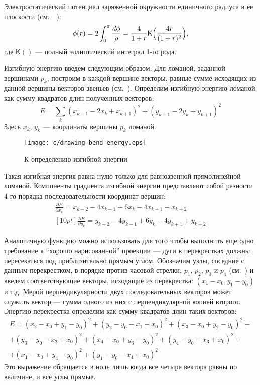 	Электростатический потенциал заряженной окружности единичного радиуса в ее плоскости (см.~~):
	$$
		\phi(r)=2\int_0^{\pi}\frac{d\phi}{\rho}=\frac{4}{1+r}\mathsf{K}\Bigl(\frac{4r}{(1+r)^2}\Bigr),
	$$
	где $\mathsf{K}()$ --- полный эллиптический интеграл 1-го рода.

	Изгибную энергию введем следующим образом. Для ломаной, заданной вершинами $p_k$, построим в каждой вершине векторы, равные
	сумме исходящих из данной вершины векторов звеньев (см.~). Определим изгибную энергию ломаной
	как сумму квадратов длин полученных векторов:
	$$
		E=\sum_k (x_{k-1}-2x_k+x_{k+1})^2+(y_{k-1}-2y_k+y_{k+1})^2
	$$
	Здесь $x_k$, $y_k$ --- координаты вершины $p_k$ ломаной.
	\begin{figure}[ht]
		\centering
		\texttt{[image: c/drawing-bend-energy.eps]}
		\caption{К определению изгибной энергии\label{figure:bend-energy}}
	\end{figure}
	Такая изгибная энергия равна нулю только для равнозвенной прямолинейной ломаной. Компоненты градиента изгибной энергии представляют
	собой разности 4-го порядка последовательности координат вершин:
	\begin{eqnarray*}
		\frac{\partial E}{\partial x_k} = x_{k-2} - 4x_{k-1} + 6x_k - 4x_{k+1} + x_{k+2} \\ [10pt]
		\frac{\partial E}{\partial y_k} = y_{k-2} - 4y_{k-1} + 6y_k - 4y_{k+1} + y_{k+2}
	\end{eqnarray*}

	Аналогичную функцию можно использовать для того чтобы выполнить еще одно требование к ``хорошо нарисованной'' проекции --- дуги в
	перекрестках должны пересекаться под приблизительно прямым углом. Обозначим узлы, соседние с данным перекрестком, в порядке против
	часовой стрелки, $p_1$, $p_2$, $p_3$ и $p_4$ (см.~) и введем соответствующие векторы, исходящие из
	перекрестка: $(x_1 - x_0, y_1 - y_0)$ и т.д. Мерой перпендикулярности двух последовательных векторов может служить вектор --- сумма
	одного из них с перпендикулярной копией второго. Энергию перекрестка определим как сумму квадратов длин таких векторов:
	\begin{eqnarray*}
		E = (x_2-x_0+y_1-y_0)^2 + (y_2-y_0-x_1+x_0)^2 + (x_3-x_0+y_2-y_0)^2 + \\
		+ (y_3-y_0-x_2+x_0)^2 + (x_4-x_0+y_3-y_0)^2 + (y_4-y_0-x_3+x_0)^2 + \\
		+ (x_1-x_0+y_4-y_0)^2 + (y_1-y_0-x_4+x_0)^2
	\end{eqnarray*}
	Это выражение обращается в ноль лишь когда все четыре вектора равны по величине, и все углы прямые.
